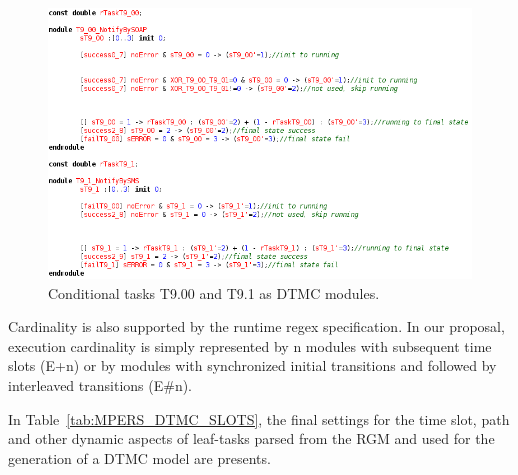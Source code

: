 \begin{figure}[ht!]
\centering
\includegraphics[width=1\textwidth]{imgs/PRISM_TRY_TSKS.png}
\caption{Conditional tasks T9.00 and T9.1 as DTMC modules.}
\label{fig:PRISM_TRY_TSKS}
\end{figure}

Cardinality is also supported by the runtime regex specification. In our proposal, execution cardinality is simply represented by n modules with subsequent time slots (E+n) or by modules with synchronized initial transitions and followed by interleaved transitions (E\#n). 



In Table~\ref{tab:MPERS_DTMC_SLOTS}, the final settings for the time slot, path and other dynamic aspects of leaf-tasks parsed from the RGM and used for the generation of a DTMC model are presents.

